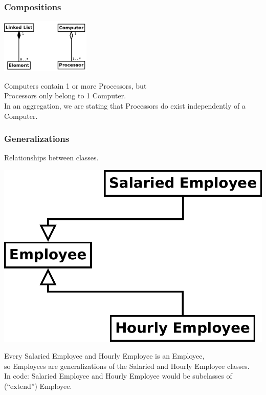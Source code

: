 \begin{frame}
\frametitle{Compositions}

\begin{changemargin}{1cm}
\begin{center}
\includegraphics[height=7em]{images/aggr-comp.pdf}
\end{center}
Computers contain 1 or more Processors, but \\
Processors only
belong to 1 Computer. \\[1em]

In an aggregation, we are stating that 
Processors do exist independently of a Computer.
\end{changemargin}
\end{frame}

\begin{frame}
\frametitle{Generalizations}

\begin{changemargin}{1cm}
Relationships between
classes.\\[1em]
\begin{center}
\includegraphics[width=.3\textwidth]{images/generalization.pdf}
\end{center}
\small
Every Salaried Employee and Hourly Employee is an Employee, \\
so Employees are generalizations of the Salaried and Hourly
Employee classes.\\[1em]

 In code: Salaried Employee
and Hourly Employee would be subclasses of (``extend'') Employee.
\end{changemargin}
\end{frame}

